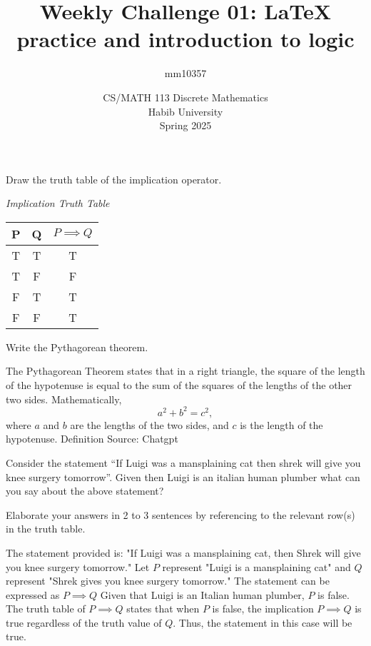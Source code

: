 \documentclass[a4paper]{exam}
\title{Weekly Challenge 01: \LaTeX\; practice and introduction to logic}
\author{mm10357} %
\date{CS/MATH 113 Discrete Mathematics\\Habib University\\Spring 2025}
\begin{document}
\maketitle

\begin{questions}
  
 Draw the truth table of the implication operator.
\begin{solution}
\hspace{3cm}\textit{Implication Truth Table}
\centering\begin{tabular}{|c|c|c|}
  \hline
  P & Q & $P \implies Q$ \\
  \hline
  T & T & T \\
  T & F & F \\
  F & T & T \\
  F & F & T \\
  \hline
  \end{tabular}
\end{solution}

 Write the Pythagorean theorem.
\begin{solution}
   The Pythagorean Theorem states that in a right triangle, the square of the length of the hypotenuse is equal to the sum of the squares of the lengths of the other two sides. Mathematically,
\[
a^2 + b^2 = c^2,
\]
where $a$ and $b$ are the lengths of the two sides, and $c$ is the length of the hypotenuse.
Definition Source: Chatgpt
\end{solution}

 Consider the statement ``If Luigi was a mansplaining cat then shrek will give you knee surgery tomorrow''. Given then Luigi is an italian human plumber what can you say about the above statement?

Elaborate your answers in 2 to 3 sentences by referencing to the relevant row(s) in the truth table.
\begin{solution}
The statement provided is: "If Luigi was a mansplaining cat, then Shrek will give you knee surgery tomorrow." Let $P$ represent "Luigi is a mansplaining cat" and $Q$ represent "Shrek gives you knee surgery tomorrow." The statement can be expressed as $P \implies Q$
Given that Luigi is an Italian human plumber, $P$ is false. The truth table of $P \implies Q$ states that when $P$ is false, the implication $P \implies Q$ is true regardless of the truth value of $Q$. Thus, the statement in this case will be true.
\end{solution}


      
\end{questions}
\end{document}
